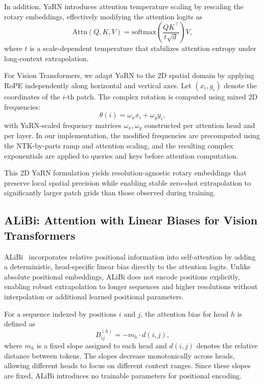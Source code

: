 In addition, YaRN introduces attention temperature scaling by rescaling the rotary embeddings, effectively modifying the attention logits as
\begin{equation}
\text{Attn}(Q,K,V) = \text{softmax}\!\left(\frac{QK^\top}{t\sqrt{d}}\right)V,
\end{equation}
where $t$ is a scale-dependent temperature that stabilizes attention entropy under long-context extrapolation.

For Vision Transformers, we adapt YaRN to the 2D spatial domain by applying RoPE independently along horizontal and vertical axes. Let $(x_i, y_i)$ denote the coordinates of the $i$-th patch. The complex rotation is computed using mixed 2D frequencies:
\begin{equation}
\theta(i) = \omega_x x_i + \omega_y y_i,
\end{equation}
with YaRN-scaled frequency matrices $\omega_x, \omega_y$ constructed per attention head and per layer. In our implementation, the modified frequencies are precomputed using the NTK-by-parts ramp and attention scaling, and the resulting complex exponentials are applied to queries and keys before attention computation.

This 2D YaRN formulation yields resolution-agnostic rotary embeddings that preserve local spatial precision while enabling stable zero-shot extrapolation to significantly larger patch grids than those observed during training.



\subsection{ALiBi: Attention with Linear Biases for Vision Transformers}

ALiBi~\cite{press2022train} incorporates relative positional information into self-attention by adding a deterministic, head-specific linear bias directly to the attention logits. Unlike absolute positional embeddings, ALiBi does not encode positions explicitly, enabling robust extrapolation to longer sequences and higher resolutions without interpolation or additional learned positional parameters.

For a sequence indexed by positions $i$ and $j$, the attention bias for head $h$ is defined as
\[
B^{(h)}_{ij} = - m_h \cdot d(i, j),
\]
where $m_h$ is a fixed slope assigned to each head and $d(i, j)$ denotes the relative distance between tokens. The slopes decrease monotonically across heads, allowing different heads to focus on different context ranges. Since these slopes are fixed, ALiBi introduces no trainable parameters for positional encoding.

